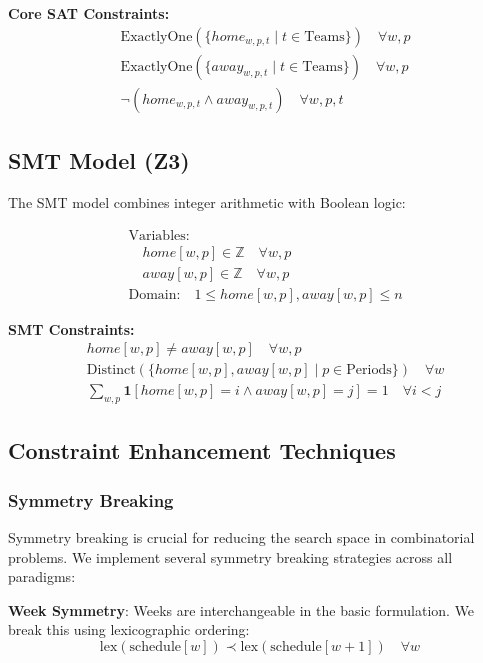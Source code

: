 \documentclass[11pt]{article}
\begin{document}
\begin{itemize}
\textbf{Core SAT Constraints:}
\begin{align}
&\text{ExactlyOne}(\{home_{w,p,t} \mid t \in \text{Teams}\}) \quad \forall w,p \\
&\text{ExactlyOne}(\{away_{w,p,t} \mid t \in \text{Teams}\}) \quad \forall w,p \\
&\neg(home_{w,p,t} \land away_{w,p,t}) \quad \forall w,p,t
\end{align}

\subsection{SMT Model (Z3)}

The SMT model combines integer arithmetic with Boolean logic:

\begin{align}
&\text{Variables:} \\
&\quad home[w,p] \in \mathbb{Z} \quad \forall w,p \\
&\quad away[w,p] \in \mathbb{Z} \quad \forall w,p \\
&\text{Domain:} \quad 1 \leq home[w,p], away[w,p] \leq n
\end{align}

\textbf{SMT Constraints:}
\begin{align}
&home[w,p] \neq away[w,p] \quad \forall w,p \\
&\text{Distinct}(\{home[w,p], away[w,p] \mid p \in \text{Periods}\}) \quad \forall w \\
&\sum_{w,p} \mathbf{1}[home[w,p] = i \land away[w,p] = j] = 1 \quad \forall i < j
\end{align}

\subsection{Constraint Enhancement Techniques}

\subsubsection{Symmetry Breaking}

Symmetry breaking is crucial for reducing the search space in combinatorial problems. We implement several symmetry breaking strategies across all paradigms:

\textbf{Week Symmetry}: Weeks are interchangeable in the basic formulation. We break this using lexicographic ordering:
\begin{equation}
\text{lex}(\text{schedule}[w]) \prec \text{lex}(\text{schedule}[w+1]) \quad \forall w
\end{equation}


\end{itemize}
\end{document}
